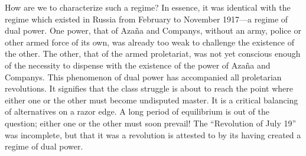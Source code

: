 How are we to characterize such a regime? In essence, it was identical with the regime which existed in Russia from February to November 1917---a regime of dual power. One power, that of Azaña and Companys, without an army, police or other armed force of its own, was already too weak to challenge the existence of the other. The other, that of the armed proletariat, was not yet conscious enough of the necessity to dispense with the existence of the power of Azaña and Companys. This phenomenon of dual power has accompanied all proletarian revolutions. It signifies that the class struggle is about to reach the point where either one or the other must become undisputed master. It is a critical balancing of alternatives on a razor edge. A long period of equilibrium is out of the question; either one or the other must soon prevail! The ``Revolution of July 19'' was incomplete, but that it was a revolution is attested to by its having created a regime of dual power.